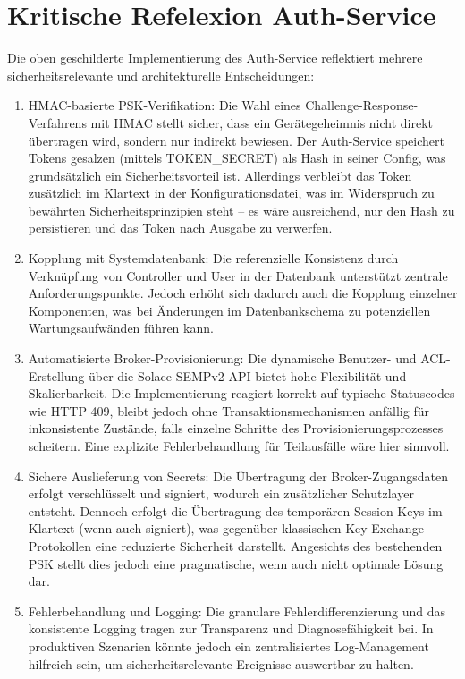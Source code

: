 \section{Kritische Refelexion Auth-Service}
Die oben geschilderte Implementierung des Auth-Service reflektiert mehrere sicherheitsrelevante und architekturelle Entscheidungen:
\begin{enumerate}
    \item HMAC-basierte PSK-Verifikation: Die Wahl eines Challenge-Response-Verfahrens mit HMAC stellt sicher, dass ein Gerätegeheimnis nicht direkt übertragen wird, sondern nur indirekt bewiesen. Der Auth-Service speichert Tokens gesalzen (mittels TOKEN\_SECRET) als Hash in seiner Config, was grundsätzlich ein Sicherheitsvorteil ist. Allerdings verbleibt das Token zusätzlich im Klartext in der Konfigurationsdatei, was im Widerspruch zu bewährten Sicherheitsprinzipien steht – es wäre ausreichend, nur den Hash zu persistieren und das Token nach Ausgabe zu verwerfen\cite{pskDesign}.
    \item Kopplung mit Systemdatenbank: Die referenzielle Konsistenz durch Verknüpfung von Controller und User in der Datenbank unterstützt zentrale Anforderungspunkte. Jedoch erhöht sich dadurch auch die Kopplung einzelner Komponenten, was bei Änderungen im Datenbankschema zu potenziellen Wartungsaufwänden führen kann.
    \item Automatisierte Broker-Provisionierung: Die dynamische Benutzer- und ACL-Erstellung über die Solace SEMPv2 API bietet hohe Flexibilität und Skalierbarkeit. Die Implementierung reagiert korrekt auf typische Statuscodes wie HTTP 409, bleibt jedoch ohne Transaktionsmechanismen anfällig für inkonsistente Zustände, falls einzelne Schritte des Provisionierungsprozesses scheitern. Eine explizite Fehlerbehandlung für Teilausfälle wäre hier sinnvoll.
    \item Sichere Auslieferung von Secrets: Die Übertragung der Broker-Zugangsdaten erfolgt verschlüsselt und signiert, wodurch ein zusätzlicher Schutzlayer entsteht. Dennoch erfolgt die Übertragung des temporären Session Keys im Klartext (wenn auch signiert), was gegenüber klassischen Key-Exchange-Protokollen eine reduzierte Sicherheit darstellt. Angesichts des bestehenden PSK stellt dies jedoch eine pragmatische, wenn auch nicht optimale Lösung dar.
    \item Fehlerbehandlung und Logging: Die granulare Fehlerdifferenzierung und das konsistente Logging tragen zur Transparenz und Diagnosefähigkeit bei. In produktiven Szenarien könnte jedoch ein zentralisiertes Log-Management hilfreich sein, um sicherheitsrelevante Ereignisse auswertbar zu halten.
\end{enumerate}

